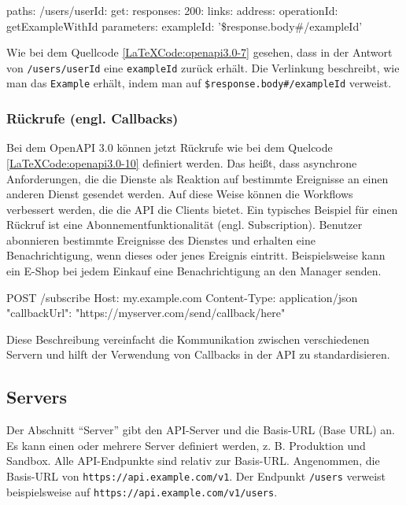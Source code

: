 \begin{LaTeXCode}[caption={Open API 3.0 - Verlinkungen},captionpos=b, label=LaTeXCode:openapi3.0-7][numbers=none]
paths: 
	/users/{userId}:
	 get:
	  responses:
	   200:
	    links:
	     address:
	      operationId: getExampleWithId
		  parameters:
		   exampleId: '\$response.body#/exampleId'
\end{LaTeXCode}

Wie bei dem Quellcode \ref{LaTeXCode:openapi3.0-7} gesehen, dass in der Antwort von \texttt{/users/{userId}} eine \texttt{exampleId} zurück erhält. Die Verlinkung beschreibt, wie man das \texttt{Example} erhält, indem man auf \texttt{\$response.body\#/exampleId} verweist.

\subsubsection{Rückrufe (engl. Callbacks)}

Bei dem OpenAPI 3.0 können jetzt Rückrufe wie bei dem Quelcode \ref{LaTeXCode:openapi3.0-10} definiert werden. Das heißt, dass asynchrone Anforderungen, die die Dienste als Reaktion auf bestimmte Ereignisse an einen anderen Dienst gesendet werden. Auf diese Weise können die Workflows verbessert werden, die die API die Clients bietet. Ein typisches Beispiel für einen Rückruf ist eine Abonnementfunktionalität (engl. Subscription). Benutzer abonnieren bestimmte Ereignisse des Dienstes und erhalten eine Benachrichtigung, wenn dieses oder jenes Ereignis eintritt. Beispielsweise kann ein E-Shop bei jedem Einkauf eine Benachrichtigung an den Manager senden\cite{openapicallbacks17}.

\begin{LaTeXCode}[caption={Open API 3.0 - Callbacks\cite{openapicallbacks17}},captionpos=b, label=LaTeXCode:openapi3.0-10][numbers=none]
POST /subscribe
Host: my.example.com
Content-Type: application/json
{
	"callbackUrl": "https://myserver.com/send/callback/here"
}
\end{LaTeXCode}

Diese Beschreibung vereinfacht die Kommunikation zwischen verschiedenen Servern und hilft der Verwendung von Callbacks in der API zu standardisieren.

\subsection{Servers}

Der Abschnitt "`Server"' gibt den API-Server und die Basis-URL (Base URL) an. Es kann einen oder mehrere Server definiert werden, z. B. Produktion und Sandbox\cite{openapiserver17}. Alle API-Endpunkte sind relativ zur Basis-URL. Angenommen, die Basis-URL von \texttt{https://api.example.com/v1}. Der Endpunkt \texttt{/users} verweist beispielsweise auf \texttt{https://api.example.com/v1/users}\cite{openapiapiserverundbaseurl17}.\\

